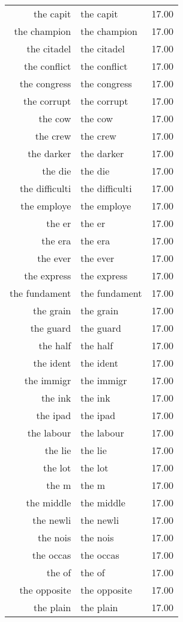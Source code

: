 \begin{table}[ht]
\begin{tabular}{rlr}
  the capit & the capit & 17.00 \\ 
  the champion & the champion & 17.00 \\ 
  the citadel & the citadel & 17.00 \\ 
  the conflict & the conflict & 17.00 \\ 
  the congress & the congress & 17.00 \\ 
  the corrupt & the corrupt & 17.00 \\ 
  the cow & the cow & 17.00 \\ 
  the crew & the crew & 17.00 \\ 
  the darker & the darker & 17.00 \\ 
  the die & the die & 17.00 \\ 
  the difficulti & the difficulti & 17.00 \\ 
  the employe & the employe & 17.00 \\ 
  the er & the er & 17.00 \\ 
  the era & the era & 17.00 \\ 
  the ever & the ever & 17.00 \\ 
  the express & the express & 17.00 \\ 
  the fundament & the fundament & 17.00 \\ 
  the grain & the grain & 17.00 \\ 
  the guard & the guard & 17.00 \\ 
  the half & the half & 17.00 \\ 
  the ident & the ident & 17.00 \\ 
  the immigr & the immigr & 17.00 \\ 
  the ink & the ink & 17.00 \\ 
  the ipad & the ipad & 17.00 \\ 
  the labour & the labour & 17.00 \\ 
  the lie & the lie & 17.00 \\ 
  the lot & the lot & 17.00 \\ 
  the m & the m & 17.00 \\ 
  the middle & the middle & 17.00 \\ 
  the newli & the newli & 17.00 \\ 
  the nois & the nois & 17.00 \\ 
  the occas & the occas & 17.00 \\ 
  the of & the of & 17.00 \\ 
  the opposite & the opposite & 17.00 \\ 
  the plain & the plain & 17.00 \\ 

\end{tabular}
\end{table}
